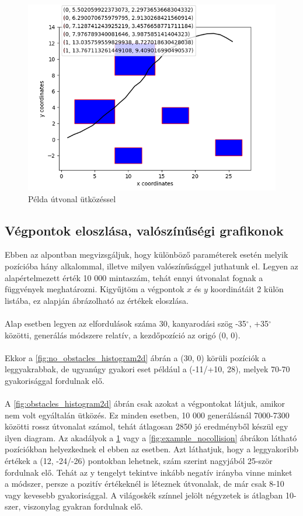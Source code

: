 \begin{figure}[h!]
\centering
\includegraphics[scale=0.75]{images/example_collision.png}
\caption{Példa útvonal ütközéssel}
\label{fig:example_collision}
\end{figure}

 

\newpage
\subsection{Végpontok eloszlása, valószínűségi grafikonok}

Ebben az alpontban megvizsgáljuk, hogy különböző paraméterek esetén melyik pozícióba hány alkalommal, illetve milyen valószínűsággel juthatunk el. Legyen az alapértelmezett érték 10 000 mintaszám, tehát ennyi útvonalat fognak a függvények meghatározni. Kigyűjtöm a végpontok $ x $ és $ y $ koordinátáit 2 külön listába, ez alapján ábrázolható az értékek eloszlása.\\\\
Alap esetben legyen az elfordulások száma 30, kanyarodási szög -35$^{\circ}$, +35$^{\circ}$ közötti, generálás módszere relatív, a kezdőpozíció az origó (0, 0).\\\\
Ekkor a \ref{fig:no_obstacles_histogram2d} ábrán a (30, 0) körüli pozíciók a leggyakrabbak, de ugyanúgy gyakori eset például a (-11/+10, 28), melyek 70-70 gyakorisággal fordulnak elő.\\\\
A \ref{fig:obstacles_histogram2d} ábrán csak azokat a végpontokat látjuk, amikor nem volt egyáltalán ütközés. Ez minden esetben, 10 000 generálásnál 7000-7300 közötti rossz útvonalat számol, tehát átlagosan 2850 jó eredményből készül egy ilyen diagram. Az akadályok a \ref{fig:example_collision} vagy a \ref{fig:example_nocollision} ábrákon látható pozíciókban helyezkednek el ebben az esetben. Azt láthatjuk, hogy a leggyakoribb értékek a (12, -24/-26) pontokban lehetnek, szám szerint nagyjából 25-ször fordulnak elő. Tehát az y tengelyt tekintve inkább negatív irányba vinne minket a módszer, persze a pozitív értékeknél is léteznek útvonalak, de már csak 8-10 vagy kevesebb gyakorisággal. A világoskék színnel jelölt négyzetek is átlagban 10-szer, viszonylag gyakran fordulnak elő.



